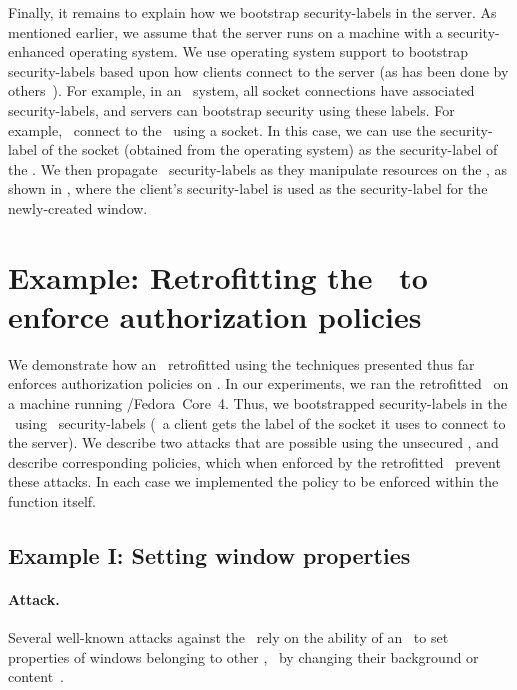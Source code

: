Finally, it remains to explain how we bootstrap security-labels in the server.
As mentioned earlier, we assume that the server runs on a machine with a
security-enhanced operating system. We use operating system support to
bootstrap security-labels based upon how clients connect to the server (as has
been done by others~\cite{s05a}). For example, in an \selinux\ system, all
socket connections have associated security-labels, and servers can bootstrap
security using these labels. For example, \xclients\ connect to the \xserver\
using a socket. In this case, we can use the security-label of the socket
(obtained from the operating system) as the security-label of the \xclient. We
then propagate \xclient\ security-labels as they manipulate resources on the
\xserver, as shown in \figref{figure:queryrefmon}, where the client's
security-label is used as the security-label for the newly-created window.


\section{Example: Retrofitting the \xserver\ to enforce authorization policies}
\label{chapter:matching:xserver-results}

We demonstrate how an \xserver\ retrofitted using the techniques presented thus
far enforces authorization policies on \xclients. In our experiments, we ran the 
retrofitted \xserver\ on a machine running \selinux/Fedora~Core~4. Thus, we
bootstrapped security-labels in the \xserver\ using \selinux\ security-labels 
(\ie\ a client gets the label of the socket it uses to connect to the server). 
We describe two attacks that are possible using the unsecured \xserver, and 
describe corresponding policies, which when enforced by the retrofitted \xserver\
prevent these attacks. In each case we implemented the policy  to be enforced
within the \code{QueryRefmon} function itself. 

\subsection{Example I: Setting window properties}

\paragraph{Attack.} Several well-known attacks against the \xserver\ rely on
the ability of an \xclient\ to set properties of windows belonging to other
\xclients, \eg\ by changing their background or content~\cite{ksv03}.

